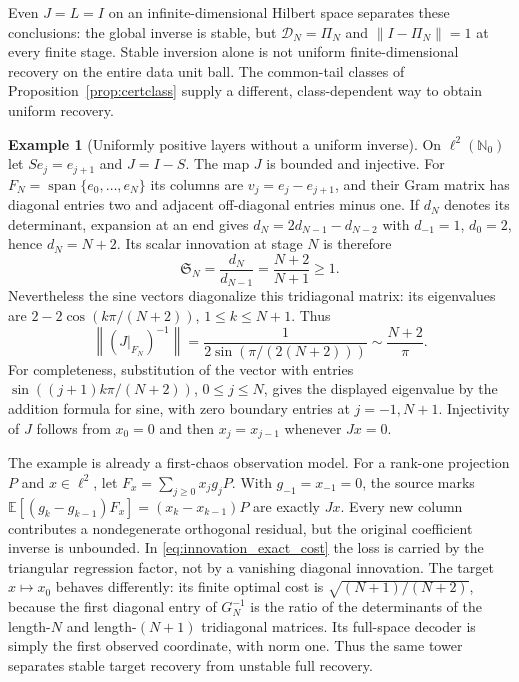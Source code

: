 \documentclass[11pt,a4paper]{amsart}
\numberwithin{equation}{section}
\theoremstyle{definition}
\newtheorem{example}[theorem]{Example}
\theoremstyle{remark}
\newcommand{\E}{\mathbb E}
\DeclareMathOperator{\Span}{span}
\newcommand{\norm}[1]{\left\lVert#1\right\rVert}
\begin{document}
Even $J=L=I$ on an infinite-dimensional Hilbert space separates these conclusions: the global inverse is stable, but $\mathscr D_N=\Pi_N$ and $\norm{I-\Pi_N}=1$ at every finite stage. Stable inversion alone is not uniform finite-dimensional recovery on the entire data unit ball. The common-tail classes of Proposition~\ref{prop:certclass} supply a different, class-dependent way to obtain uniform recovery.

\begin{example}[Uniformly positive layers without a uniform inverse]\label{ex:innovation_conditioning}
On $\ell^2(\mathbb N_0)$ let $Se_j=e_{j+1}$ and $J=I-S$. The map $J$ is bounded and injective. For $F_N=\Span\{e_0,\ldots,e_N\}$ its columns are $v_j=e_j-e_{j+1}$, and their Gram matrix has diagonal entries two and adjacent off-diagonal entries minus one. If $d_N$ denotes its determinant, expansion at an end gives
$d_N=2d_{N-1}-d_{N-2}$ with $d_{-1}=1$, $d_0=2$, hence $d_N=N+2$. Its scalar innovation at stage $N$ is therefore
\begin{equation}\label{eq:innovation_shift_pivots}
 \mathfrak S_N=\frac{d_N}{d_{N-1}}=\frac{N+2}{N+1}\ge1.
\end{equation}
Nevertheless the sine vectors diagonalize this tridiagonal matrix: its eigenvalues are $2-2\cos(k\pi/(N+2))$, $1\le k\le N+1$. Thus
\begin{equation}\label{eq:innovation_shift_inverse}
 \norm{(J|_{F_N})^{-1}}
 =\frac1{2\sin(\pi/(2(N+2)))}\sim\frac{N+2}{\pi}.
\end{equation}
For completeness, substitution of the vector with entries
$\sin((j+1)k\pi/(N+2))$, $0\le j\le N$, gives the displayed eigenvalue by the addition formula for sine, with zero boundary entries at $j=-1,N+1$. Injectivity of $J$ follows from $x_0=0$ and then $x_j=x_{j-1}$ whenever $Jx=0$.

The example is already a first-chaos observation model. For a rank-one projection $P$ and $x\in\ell^2$, let $F_x=\sum_{j\ge0}x_jg_jP$. With $g_{-1}=x_{-1}=0$, the source marks
$\E[(g_k-g_{k-1})F_x]=(x_k-x_{k-1})P$
are exactly $Jx$. Every new column contributes a nondegenerate orthogonal residual, but the original coefficient inverse is unbounded. In \eqref{eq:innovation_exact_cost} the loss is carried by the triangular regression factor, not by a vanishing diagonal innovation. The target $x\mapsto x_0$ behaves differently: its finite optimal cost is $\sqrt{(N+1)/(N+2)}$, because the first diagonal entry of $G_N^{-1}$ is the ratio of the determinants of the length-$N$ and length-$(N+1)$ tridiagonal matrices. Its full-space decoder is simply the first observed coordinate, with norm one. Thus the same tower separates stable target recovery from unstable full recovery.
\end{example}
\end{document}

